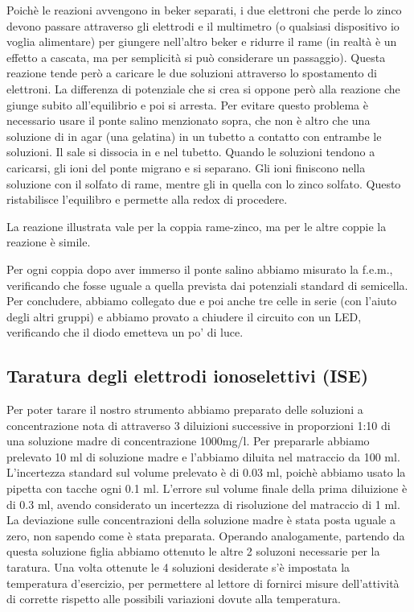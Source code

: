 Poichè le reazioni avvengono in beker separati, i due elettroni che perde lo zinco devono passare
attraverso gli elettrodi e il multimetro (o qualsiasi dispositivo io voglia alimentare)
per giungere nell'altro beker e ridurre il rame
(in realtà è un effetto a cascata, ma per semplicità si può considerare un passaggio). Questa reazione 
tende però a caricare le due soluzioni attraverso lo spostamento di elettroni. La differenza di potenziale che
si crea si oppone però alla reazione che giunge subito all'equilibrio e poi si arresta. Per evitare questo problema
è necessario usare il ponte salino menzionato sopra, che non è altro che una soluzione di  in agar (una gelatina) in un tubetto a contatto con entrambe le soluzioni. Il sale si dissocia in  e  nel tubetto.
Quando le soluzioni tendono a caricarsi, gli ioni del ponte migrano e si separano. Gli ioni  finiscono
nella soluzione con il solfato di rame, mentre gli  in quella con lo zinco solfato. Questo ristabilisce l'equilibro e permette alla redox di procedere.

La reazione illustrata vale per la coppia rame-zinco, ma per le altre coppie la reazione è simile. 

Per ogni coppia dopo aver immerso il ponte salino abbiamo misurato la f.e.m., verificando che fosse
uguale a quella prevista dai potenziali standard di semicella. Per concludere, abbiamo collegato due e poi anche tre
celle in serie (con l'aiuto degli altri gruppi) e abbiamo provato a chiudere il circuito con un LED, verificando
che il diodo emetteva un po' di luce. 
\subsection*{Taratura degli elettrodi ionoselettivi (ISE)}
Per poter tarare il nostro strumento abbiamo preparato delle soluzioni a concentrazione nota di  attraverso 3 diluizioni successive in proporzioni 1:10 di una soluzione madre di concentrazione 1000mg/l. 
Per prepararle abbiamo prelevato 10 ml di soluzione madre e l'abbiamo diluita nel matraccio da 100 ml.%
L'incertezza standard sul volume prelevato è di 0.03 ml, poichè abbiamo usato la pipetta con tacche ogni 0.1 ml.
L'errore sul volume finale della prima diluizione è di 0.3 ml, avendo considerato un incertezza di risoluzione del matraccio
di 1 ml. La deviazione sulle concentrazioni della soluzione madre è stata posta uguale a zero, non sapendo come è
stata preparata.
Operando analogamente, partendo da questa soluzione figlia abbiamo ottenuto le altre 2 soluzoni necessarie per la taratura. 
Una volta ottenute le 4 soluzioni desiderate s'è impostata la temperatura d'esercizio, per permettere al lettore di fornirci misure dell'attività di  corrette rispetto alle possibili variazioni dovute alla temperatura.